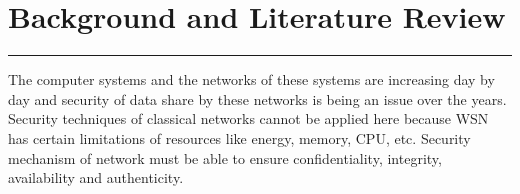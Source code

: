 \chapter{Background and Literature Review}
\label{C4} %
\graphicspath{{Figures/PDF/}{Figures/PNG/}}
\noindent\rule{\linewidth}{2pt}


\noindent
The computer systems and the networks of these systems are increasing day by day and security of data share by these networks is being an issue over the years. Security techniques of classical networks cannot be applied here because WSN has certain limitations of resources like energy, memory, CPU, etc. Security mechanism of network must be able to ensure confidentiality, integrity, availability and authenticity.
